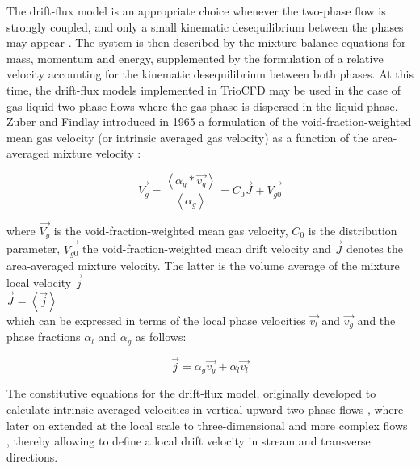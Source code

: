 The drift-flux model is an appropriate choice whenever the two-phase flow is strongly coupled, and only a small kinematic desequilibrium between the phases may appear \cite{hibiki2002distribution}. The system is then described by the mixture balance equations for mass, momentum and energy, supplemented by the formulation of a relative velocity accounting for the kinematic desequilibrium between both phases. At this time, the drift-flux models implemented in TrioCFD may be used in the case of gas-liquid two-phase flows where the gas phase is dispersed in the liquid phase.\\

Zuber and Findlay \cite{zuber1965average} introduced in 1965 a formulation of the void-fraction-weighted mean gas velocity (or intrinsic averaged gas velocity) as a function of the area-averaged mixture velocity : 

	\begin{equation}\label{eq_drift-velocity}
		\overrightarrow{V_g} = \frac{\left\langle\alpha_g * \overrightarrow{v_g}\right\rangle}{\left\langle\alpha_g\right\rangle} = C_0 \overrightarrow{J} + \overrightarrow{V_{g0}} 
	\end{equation}
	
	
where $\overrightarrow{V_g}$ is the void-fraction-weighted mean gas velocity, $C_0$ is the distribution parameter, $\overrightarrow{V_{g0}}$ the void-fraction-weighted mean drift velocity and $\overrightarrow{J}$ denotes the area-averaged mixture velocity. The latter is the volume average of the mixture local velocity $\overrightarrow{j}$ \\

$\overrightarrow{J} = \left\langle \overrightarrow{j} \right\rangle $  \\

which can be expressed in terms of the local phase velocities $\overrightarrow{v_l}$ and $\overrightarrow{v_g}$ and the phase fractions $\alpha_l$ and $\alpha_g$ as follows: 
	
	\begin{equation}
		\overrightarrow{j} = \alpha_g \overrightarrow{v_g} + \alpha_l \overrightarrow{v_l}
	\end{equation}
	



The constitutive equations for the drift-flux model, originally developed to calculate intrinsic averaged velocities in vertical upward two-phase flows \cite{zuber1965average}\cite{ishii1977one}, where later on extended at the local scale to three-dimensional and more complex flows \cite{manninen1996mixture}\cite{mahdavi2017implementation}, thereby allowing to define a local drift velocity in stream and transverse directions.\\


